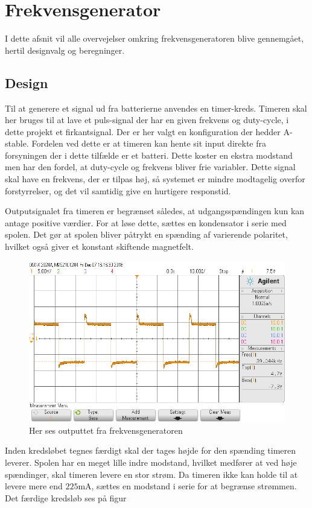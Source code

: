 \section{Frekvensgenerator}\label{sec:frekv_gen}
I dette afsnit vil alle overvejelser omkring frekvensgeneratoren blive gennemgået, hertil designvalg og beregninger. 
\subsection{Design}
Til at generere et signal ud fra batterierne anvendes en timer-kreds. 
Timeren skal her bruges til at lave et puls-signal der har en given frekvens og duty-cycle, i dette projekt et firkantsignal. 
Der er her valgt en konfiguration der hedder A-stable. 
Fordelen ved dette er at timeren kan hente sit input direkte fra forsyningen der i dette tilfælde er et batteri. Dette koster en ekstra modstand men har den fordel, at duty-cycle og frekvens bliver frie variabler. 
Dette signal skal have en frekvens, der er tilpas høj, så systemet er mindre modtagelig overfor forstyrrelser, og det vil samtidig give en hurtigere responstid. 

Outputsignalet fra timeren er begrænset således, at udgangsspændingen kun kan antage positive værdier.
For at løse dette, sættes en kondensator i serie med spolen.
Det gør at spolen bliver påtrykt en spænding af varierende polaritet, hvilket også giver et konstant skiftende magnetfelt.
\begin{figure}[h!]
	\centering
	\includegraphics[width=1\textwidth]{billeder/freq_png.png}
	\caption{Her ses outputtet fra frekvensgeneratoren}
	\label{fig:frekvensgenerator}
\end{figure}
Inden kredsløbet tegnes færdigt skal der tages højde for den spænding timeren leverer. 
Spolen har en meget lille indre modstand, hvilket medfører at ved høje spændinger, skal timeren levere en stor strøm. 
Da timeren ikke kan holde til at levere mere end $225 \si{\milli\ampere}$, sættes en modstand i serie for at begrænse strømmen. 
Det færdige kredsløb ses på figur 

